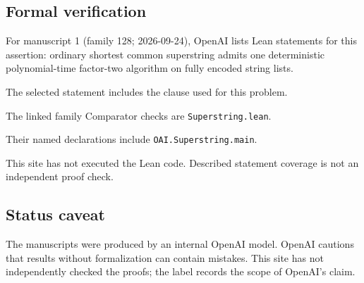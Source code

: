 \documentclass[11pt]{article}
\begin{document}
\subsection{Formal verification}
For manuscript 1 (family 128; 2026-09-24), OpenAI lists Lean statements for this assertion: ordinary shortest common superstring admits one deterministic polynomial-time factor-two algorithm on fully encoded string lists.

The selected statement includes the clause used for this problem.

The linked family Comparator checks are \texttt{Superstring.lean}.

Their named declarations include \texttt{OAI.Superstring.main}.

This site has not executed the Lean code. Described statement coverage is not an independent proof check.

\subsection{Status caveat}
The manuscripts were produced by an internal OpenAI model. OpenAI cautions that results without formalization can contain mistakes. This site has not independently checked the proofs; the label records the scope of OpenAI's claim.
\end{document}
